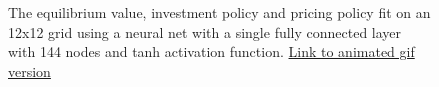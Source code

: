 \documentclass[12pt]{article}
\begin{document}
\begin{figure}[H]
  \centering
  \caption{The equilibrium value, investment policy and pricing policy fit on an 12x12 grid using a neural net with a single fully connected layer with 144 nodes and tanh activation function. \href{https://github.com/wmjones/VFA-for-dynamic-games/blob/master/gif_ann_12.gif}{Link to animated gif version}}
\end{figure}
\end{document}
